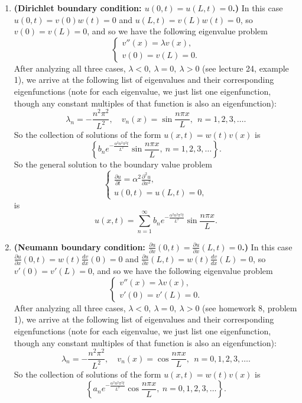 \documentclass[a4paper]{article}
\theoremstyle{definition}
\numberwithin{equation}{section}
\begin{document}
\begin{enumerate}
	\item \textbf{(Dirichlet boundary condition: $u(0,t)=u(L,t)=0$.)} In this case $u(0,t)=v(0)w(t)=0$ and $u(L,t)=v(L)w(t)=0$, so $v(0)=v(L)=0$, and so we have the following eigenvalue problem 
	\[
	\begin{cases}
	v''(x)=\lambda v(x), \\
	v(0)=v(L)=0.
	\end{cases}
	\]
After analyzing all three cases, $\lambda<0, \ \lambda=0,\ \lambda>0$ (see lecture 24, example 1), we arrive at the following list of eigenvalues and their corresponding eigenfunctions (note for each eigenvalue, we just list one eigenfunction, though any constant multiples of that function is also an eigenfunction):
\[
\lambda_n=-\frac{n^2\pi^2}{L^2},\quad v_n(x)=\sin \frac{n\pi x}{L}, \ \ n=1,2, 3,\ldots.
\]
So the collection of solutions of the form $u(x,t)=w(t)v(x)$ is
\[
\left\{ b_ne^{-\frac{\alpha^2n^2\pi^2t}{L^2}} \sin \frac{n\pi x}{L} , \  n=1,2, 3, \ldots \right\}.
\]
So the general solution to the boundary value problem 
\[
\begin{cases}
\frac{\partial u}{\partial t} =\alpha^2 \frac{\partial^2u}{\partial x^2},\\
u(0,t)=u(L,t)=0,
\end{cases}
\]
is
\[
u(x,t)=\sum_{n=1}^\infty b_ne^{-\frac{\alpha^2n^2\pi^2t}{L^2}} \sin \frac{n\pi x}{L}.
\]
\vspace{0.2in}
\item \textbf{(Neumann boundary condition: $\frac{\partial u}{\partial x}(0,t)=\frac{\partial u}{\partial x}(L,t)=0$.)} In this case $\frac{\partial u}{\partial x}(0,t)=w(t)\frac{dv}{dx}(0)=0$ and $\frac{\partial u}{\partial x}(L,t)=w(t) \frac{dv}{dx}(L)=0$, so $v'(0)=v'(L)=0$, and so we have the following eigenvalue problem 
	\[
	\begin{cases}
	v''(x)=\lambda v(x), \\
	v'(0)=v'(L)=0.
	\end{cases}
	\]
After analyzing all three cases, $\lambda<0, \ \lambda=0,\ \lambda>0$ (see homework 8, problem 1), we arrive at the following list of eigenvalues and their corresponding eigenfunctions (note for each eigenvalue, we just list one eigenfunction, though any constant multiples of that function is also an eigenfunction):
\[
\lambda_n=-\frac{n^2\pi^2}{L^2},\quad v_n(x)=\cos \frac{n\pi x}{L}, \ \ n=0, 1,2, 3,\ldots.
\]
So the collection of solutions of the form $u(x,t)=w(t)v(x)$ is
\[
\left\{ a_ne^{-\frac{\alpha^2n^2\pi^2t}{L^2}} \cos \frac{n\pi x}{L} , \  n=0, 1,2, 3, \ldots \right\}.
\]
\end{enumerate}
\end{document}
